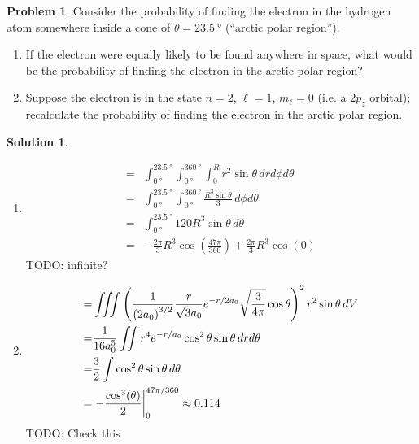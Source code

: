 \documentclass[10pt]{article}
\theoremstyle{definition}
\newtheorem{problem}{Problem}
\newtheorem{soln}{Solution}
\begin{document}
\begin{problem}
Consider the probability of finding the electron in the hydrogen atom somewhere inside a cone of $\theta=\qty{23.5}{\degree}$
(``arctic polar region'').
\begin{enumerate}[label=(\alph*)]
  \item If the electron were equally likely to be found anywhere in space, what would be the probability of finding the
        electron in the arctic polar region?
  \item Suppose the electron is in the state $n = 2$, $\ell = 1$, $m_\ell = 0$ (i.e. a $2p_z$ orbital); recalculate the probability of
        finding the electron in the arctic polar region.
\end{enumerate}
\end{problem}
\begin{soln}
  \begin{enumerate}[label=(\alph*)]
    \item \begin{align*}
            = & \int_{\qty{0}{\degree}}^{\qty{23.5}{\degree}}\int_{\qty{0}{\degree}}^{\qty{360}{\degree}}\int_0^R r^2\sin\theta\,dr d\phi d\theta \\
            = & \int_{\qty{0}{\degree}}^{\qty{23.5}{\degree}}\int_{\qty{0}{\degree}}^{\qty{360}{\degree}} \frac{R^3\sin\theta}{3}\, d\phi d\theta \\
            = & \int_{\qty{0}{\degree}}^{\qty{23.5}{\degree}}120R^3\sin\theta\,  d\theta                                                          \\
            = & -\frac{2\pi}{3}R^3\cos\left(\frac{47\pi}{360}\right)+\frac{2\pi}{3}R^3\cos\left(0\right)
          \end{align*}
          TODO: infinite?
    \item \begin{align*}
            = & \iiint \left(\frac{1}{\left(2a_0\right)^{3/2}}\frac{r}{\sqrt{3}a_0}e^{-r/2a_0}\sqrt{\frac{3}{4\pi}}\cos\theta\right)^2r^2\sin\theta\,dV \\
            = & \frac{1}{16a_0^5}\iint r^4e^{-r/a_0}\cos^2\theta\sin\theta\,dr d\theta                                                                  \\
            = & \frac{3}{2}\int \cos^2\theta\sin\theta\,d\theta                                                                                      \\
            = & \eval{-\frac{\cos^3(\theta)}{2}}_{0}^{47\pi/360}\approx 0.114                                                              
          \end{align*}
          TODO: Check this
  \end{enumerate}
\end{soln}
\end{document}
